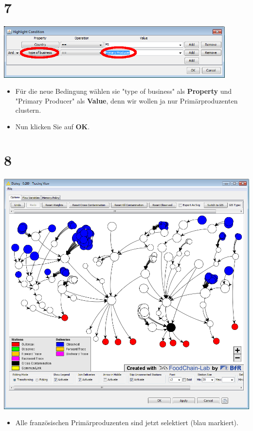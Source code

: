 \documentclass{beamer}
\begin{document}
\section{7}
\begin{frame}
	\begin{center}
  		\includegraphics[width=0.9\textwidth]{7.png}
	\end{center}
	\begin{itemize}
		\item Für die neue Bedingung wählen sie "type of business" als \textbf{Property} und "Primary Producer" als \textbf{Value}, denn wir wollen ja nur Primärproduzenten clustern.
		\item Nun klicken Sie auf \textbf{OK}.
	\end{itemize}
\end{frame}

\section{8}
\begin{frame}
	\begin{center}
  		\includegraphics[height=0.6\textheight]{8.png}
	\end{center}
	\begin{itemize}
		\item Alle französischen Primärproduzenten sind jetzt selektiert (blau markiert).
	\end{itemize}
\end{frame}
\end{document}
